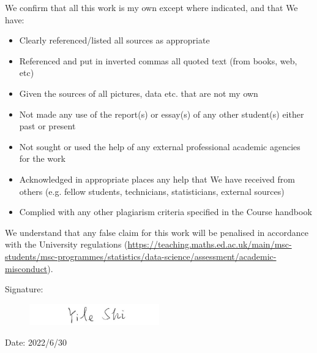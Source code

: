 \documentclass[11pt,twoside]{article}
\numberwithin{Theorem}{section}
\numberwithin{Definition}{section}
\numberwithin{Lemma}{section}
\numberwithin{Algorithm}{section}
\numberwithin{equation}{section}
\begin{document}
\vspace{1cm}

We confirm that all this work is my own except where indicated, and that We have:
\begin{itemize}
\item	Clearly referenced/listed all sources as appropriate	 				
\item	Referenced and put in inverted commas all quoted text (from books, web, etc)	
\item	Given the sources of all pictures, data etc. that are not my own				
\item	Not made any use of the report(s) or essay(s) of any other student(s) either past 	
or present	
\item	Not sought or used the help of any external professional academic agencies for the work
\item	Acknowledged in appropriate places any help that We have received from others	(e.g. fellow students, technicians, statisticians, external sources)
\item	Complied with any other plagiarism criteria specified in the Course handbook
\end{itemize}

We understand that any false claim for this work will be penalised in accordance with
the University regulations	(\url{https://teaching.maths.ed.ac.uk/main/msc-students/msc-programmes/statistics/data-science/assessment/academic-misconduct}).								

\vspace{1cm}

Signature:

\begin{figure}[!h]
	\includegraphics[width = 0.5\textwidth]{Images/Signature.png}
\end{figure}

\vspace{5mm}

Date: 2022/6/30

\clearpage


\pagestyle{plain}
\setcounter{page}{1}
\end{document}

